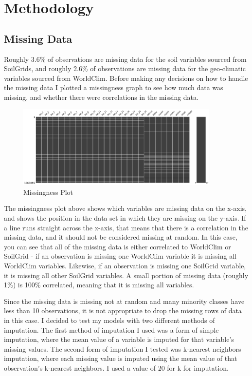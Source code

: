 \documentclass[12pt, oneside]{article}
\begin{document}
\section{Methodology}
\label{Methodology}

\begin{normalsize}

\subsection{Missing Data}

Roughly 3.6\% of observations are missing data for the soil variables sourced from SoilGrids, and roughly 2.6\% of observations are missing data for the geo-climatic variables sourced from WorldClim. Before making any decisions on how to handle the missing data I plotted a missingness graph to see how much data was missing, and whether there were correlations in the missing data.

\begin{figure}[H]
\caption{Missingness Plot}
\centering
\includegraphics[width=0.9\textwidth]{missingno}
\end{figure}

The missingness plot above shows which variables are missing data on the x-axis, and shows the position in the data set in which they are missing on the y-axis. If a line runs straight across the x-axis, that means that there is a correlation in the missing data, and it should not be considered missing at random. In this case, you can see that all of the missing data is either correlated to WorldClim or SoilGrid - if an observation is missing one WorldClim variable it is missing all WorldClim variables. Likewise, if an observation is missing one SoilGrid variable, it is missing all other SoilGrid variables. A small portion of missing data (roughly 1\%) is 100\% correlated, meaning that it is missing all variables. 

Since the missing data is missing not at random and many minority classes have less than 10 observations, it is not appropriate to drop the missing rows of data in this case. I decided to test my models with two different methods of imputation. The first method of imputation I used was a form of simple imputation, where the mean value of a variable is imputed for that variable's missing values. The second form of imputation I tested was k-nearest neighbors imputation, where each missing value is imputed using the mean value of that observation's k-nearest neighbors. I used a value of 20 for k for imputation.


\end{normalsize}
\end{document}
